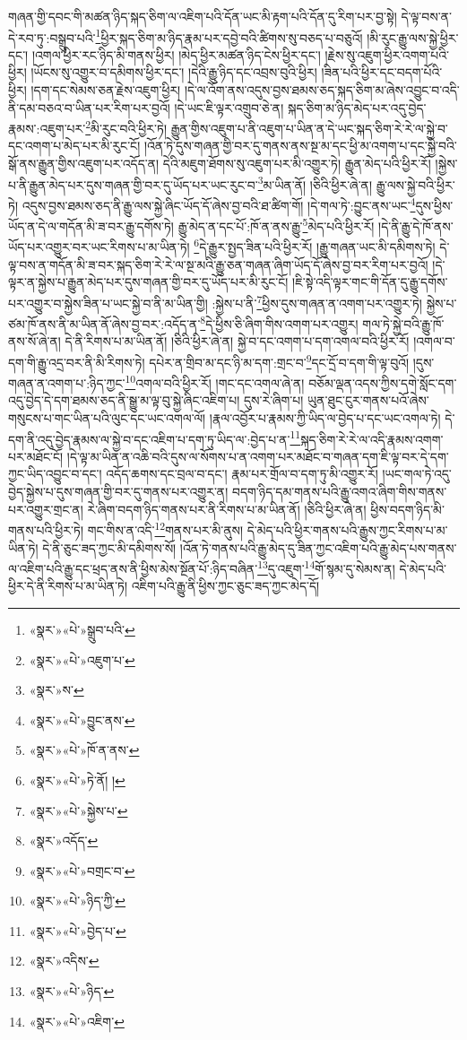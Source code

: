 གཞན་གྱི་དབང་གི་མཚན་ཉིད་སྐད་ཅིག་ལ་འཇིག་པའི་དོན་ཡང་མི་རྟག་པའི་དོན་དུ་རིག་པར་བྱ་སྟེ། དེ་ལྟ་བས་ན་དེ་རབ་ཏུ་:བསྒྲུབ་པའི་\footnote{«སྣར་»«པེ་»སྒྲུབ་པའི་}ཕྱིར་སྐད་ཅིག་མ་ཉིད་རྣམ་པར་དབྱེ་བའི་ཚིགས་སུ་བཅད་པ་བཅུའོ། །མི་རུང་རྒྱུ་ལས་སྐྱེ་ཕྱིར་དང་། །འགལ་ཕྱིར་རང་ཉིད་མི་གནས་ཕྱིར། །མེད་ཕྱིར་མཚན་ཉིད་ངེས་ཕྱིར་དང་། །རྗེས་སུ་འཇུག་ཕྱིར་འགག་པའི་ཕྱིར། །ཡོངས་སུ་འགྱུར་བ་དམིགས་ཕྱིར་དང་། །དེའི་རྒྱུ་ཉིད་དང་འབྲས་བུའི་ཕྱིར། །ཟིན་པའི་ཕྱིར་དང་བདག་པོའི་ཕྱིར། །དག་དང་སེམས་ཅན་རྗེས་འཇུག་ཕྱིར། །དེ་ལ་འོག་ནས་འདུས་བྱས་ཐམས་ཅད་སྐད་ཅིག་མ་ཞེས་འབྱུང་བ་འདི་ནི་དམ་བཅའ་བ་ཡིན་པར་རིག་པར་བྱའོ། །དེ་ཡང་ཇི་ལྟར་འགྲུབ་ཅེ་ན། སྐད་ཅིག་མ་ཉིད་མེད་པར་འདུ་བྱེད་རྣམས་:འཇུག་པར་\footnote{«སྣར་»«པེ་»འཇུག་པ་}མི་རུང་བའི་ཕྱིར་ཏེ། རྒྱུན་གྱིས་འཇུག་པ་ནི་འཇུག་པ་ཡིན་ན་དེ་ཡང་སྐད་ཅིག་རེ་རེ་ལ་སྐྱེ་བ་དང་འགག་པ་མེད་པར་མི་རུང་ངོ། །འོན་ཏེ་དུས་གཞན་གྱི་བར་དུ་གནས་ནས་སྔ་མ་དང་ཕྱི་མ་འགག་པ་དང་སྐྱེ་བའི་སྒོ་ནས་རྒྱུན་གྱིས་འཇུག་པར་འདོད་ན། དེའི་མཇུག་ཐོགས་སུ་འཇུག་པར་མི་འགྱུར་ཏེ། རྒྱུན་མེད་པའི་ཕྱིར་རོ། །སྐྱེས་པ་ནི་རྒྱུན་མེད་པར་དུས་གཞན་གྱི་བར་དུ་ཡོད་པར་ཡང་རུང་བ་\footnote{«སྣར་»ས་}མ་ཡིན་ནོ། །ཅིའི་ཕྱིར་ཞེ་ན། རྒྱུ་ལས་སྐྱེ་བའི་ཕྱིར་ཏེ། འདུས་བྱས་ཐམས་ཅད་ནི་རྒྱུ་ལས་སྐྱེ་ཞིང་ཡོད་དོ་ཞེས་བྱ་བའི་ཐ་ཚིག་གོ། །དེ་གལ་ཏེ་:བྱུང་ནས་ཡང་\footnote{«སྣར་»«པེ་»བྱུང་ནས་}དུས་ཕྱིས་ཡོད་ན་དེ་ལ་གདོན་མི་ཟ་བར་རྒྱུ་དགོས་ཏེ། རྒྱུ་མེད་ན་དང་པོ་:ཁོ་ན་ནས་རྒྱུ་\footnote{«སྣར་»«པེ་»ཁོ་ན་ནས་}མེད་པའི་ཕྱིར་རོ། །དེ་ནི་རྒྱུ་དེ་ཁོ་ནས་ཡོད་པར་འགྱུར་བར་ཡང་རིགས་པ་མ་ཡིན་ཏེ། \footnote{«སྣར་»«པེ་»ཏེ་ནོ། ། }དེ་རྒྱུར་སྤྱད་ཟིན་པའི་ཕྱིར་རོ། །རྒྱུ་གཞན་ཡང་མི་དམིགས་ཏེ། དེ་ལྟ་བས་ན་གདོན་མི་ཟ་བར་སྐད་ཅིག་རེ་རེ་ལ་སྔ་མའི་རྒྱུ་ཅན་གཞན་ཞིག་ཡོད་དོ་ཞེས་བྱ་བར་རིག་པར་བྱའོ། །དེ་ལྟར་ན་སྐྱེས་པ་རྒྱུན་མེད་པར་དུས་གཞན་གྱི་བར་དུ་ཡོད་པར་མི་རུང་ངོ། །ཇི་སྟེ་འདི་ལྟར་གང་གི་དོན་དུ་རྒྱུ་དགོས་པར་འགྱུར་བ་སྐྱེས་ཟིན་པ་ཡང་སྐྱེ་བ་ནི་མ་ཡིན་གྱི། :སྐྱེས་པ་ནི་\footnote{«སྣར་»«པེ་»སྐྱེས་པ་}ཕྱིས་དུས་གཞན་ན་འགག་པར་འགྱུར་ཏེ། སྐྱེས་པ་ཙམ་ཁོ་ནས་ནི་མ་ཡིན་ནོ་ཞེས་བྱ་བར་:འདོད་ན་\footnote{«སྣར་»འདོད་}དེ་ཕྱིས་ཅི་ཞིག་གིས་འགག་པར་འགྱུར། གལ་ཏེ་སྐྱེ་བའི་རྒྱུ་ཁོ་ནས་སོ་ཞེ་ན། དེ་ནི་རིགས་པ་མ་ཡིན་ནོ། །ཅིའི་ཕྱིར་ཞེ་ན། སྐྱེ་བ་དང་འགག་པ་དག་འགལ་བའི་ཕྱིར་རོ། །འགལ་བ་དག་གི་རྒྱུ་འདྲ་བར་ནི་མི་རིགས་ཏེ། དཔེར་ན་གྲིབ་མ་དང་ཉི་མ་དག་:གྲང་བ་\footnote{«སྣར་»«པེ་»བགྲང་བ་}དང་དྲོ་བ་དག་གི་ལྟ་བུའོ། །དུས་གཞན་ན་འགག་པ་:ཉིད་ཀྱང་\footnote{«སྣར་»«པེ་»ཉིད་ཀྱི་}འགལ་བའི་ཕྱིར་རོ། །གང་དང་འགལ་ཞེ་ན། བཅོམ་ལྡན་འདས་ཀྱིས་དགེ་སློང་དག་འདུ་བྱེད་དེ་དག་ཐམས་ཅད་ནི་སྒྱུ་མ་ལྟ་བུ་སྐྱེ་ཞིང་འཇིག་པ། དུས་རེ་ཞིག་པ། ཡུན་ཐུང་ངུར་གནས་པའོ་ཞེས་གསུངས་པ་གང་ཡིན་པའི་ལུང་དང་ཡང་འགལ་ལོ། །རྣལ་འབྱོར་པ་རྣམས་ཀྱི་ཡིད་ལ་བྱེད་པ་དང་ཡང་འགལ་ཏེ། དེ་དག་ནི་འདུ་བྱེད་རྣམས་ལ་སྐྱེ་བ་དང་འཇིག་པ་དག་ཏུ་ཡིད་ལ་:བྱེད་པ་ན་\footnote{«སྣར་»«པེ་»བྱེད་པ་}སྐད་ཅིག་རེ་རེ་ལ་འདི་རྣམས་འགག་པར་མཐོང་ངོ། །དེ་ལྟ་མ་ཡིན་ན་འཆི་བའི་དུས་ལ་སོགས་པ་ན་འགག་པར་མཐོང་བ་གཞན་དག་ཇི་ལྟ་བར་དེ་དག་ཀྱང་ཡིད་འབྱུང་བ་དང་། འདོད་ཆགས་དང་བྲལ་བ་དང་། རྣམ་པར་གྲོལ་བ་དག་ཏུ་མི་འགྱུར་རོ། །ཡང་གལ་ཏེ་འདུ་བྱེད་སྐྱེས་པ་དུས་གཞན་གྱི་བར་དུ་གནས་པར་འགྱུར་ན། བདག་ཉིད་དམ་གནས་པའི་རྒྱུ་འགའ་ཞིག་གིས་གནས་པར་འགྱུར་གྲང་ན། རེ་ཞིག་བདག་ཉིད་གནས་པར་ནི་རིགས་པ་མ་ཡིན་ནོ། །ཅིའི་ཕྱིར་ཞེ་ན། ཕྱིས་བདག་ཉིད་མི་གནས་པའི་ཕྱིར་ཏེ། གང་གིས་ན་འདི་\footnote{«སྣར་»འདིས་}གནས་པར་མི་ནུས། དེ་མེད་པའི་ཕྱིར་གནས་པའི་རྒྱུས་ཀྱང་རིགས་པ་མ་ཡིན་ཏེ། དེ་ནི་ཅུང་ཟད་ཀྱང་མི་དམིགས་སོ། །འོན་ཏེ་གནས་པའི་རྒྱུ་མེད་དུ་ཟིན་ཀྱང་འཇིག་པའི་རྒྱུ་མེད་པས་གནས་ལ་འཇིག་པའི་རྒྱུ་དང་ཕྲད་ནས་ནི་ཕྱིས་མེས་སྔོན་པོ་:ཉིད་བཞིན་\footnote{«སྣར་»«པེ་»ཉིད་}དུ་འཇུག་\footnote{«སྣར་»«པེ་»འཇིག་}གོ་སྙམ་དུ་སེམས་ན། དེ་མེད་པའི་ཕྱིར་དེ་ནི་རིགས་པ་མ་ཡིན་ཏེ། འཇིག་པའི་རྒྱུ་ནི་ཕྱིས་ཀྱང་ཅུང་ཟད་ཀྱང་མེད་དོ། 